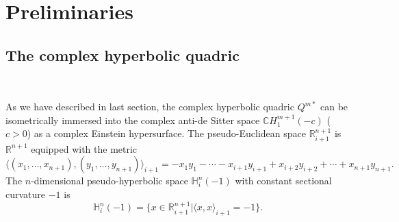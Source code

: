 \documentclass[reqno]{amsart}%
\theoremstyle{definition}
\numberwithin{equation}{section}
\begin{document}
\section{Preliminaries}\label{sect:2}

\subsection{The complex hyperbolic quadric}\label{sect:2.1}~


As we have described in last section, the complex hyperbolic quadric
$Q^{m\ast}$ can be isometrically
immersed into the complex anti-de Sitter space $\mathbb{C}H_1^{m+1}(-c)$
($c>0$) as a complex Einstein hypersurface.
The pseudo-Euclidean space $\mathbb{R}^{n+1}_{i+1}$ is $\mathbb{R}^{n+1}$ equipped with the metric
$$
\langle(x_1,\ldots, x_{n+1}),(y_1,\ldots, y_{n+1})\rangle_{i+1}=-x_1y_1-\cdots-x_{i+1}y_{i+1}
+x_{i+2}y_{i+2}+\cdots+x_{n+1}y_{n+1}.
$$
The $n$-dimensional pseudo-hyperbolic space $\mathbb{H}^n_i(-1)$ with  constant sectional curvature $-1$ is
$$
\mathbb{H}^n_i(-1)=\{x\in \mathbb{R}^{n+1}_{i+1}|\langle x,x\rangle_{i+1}=-1\}.
$$
\end{document}
